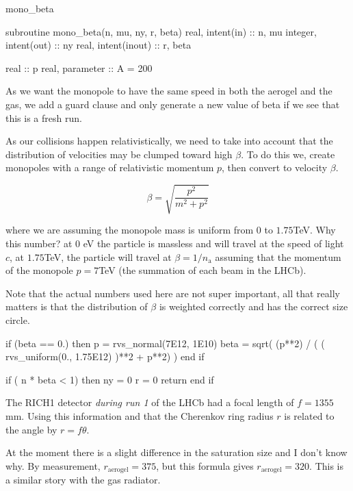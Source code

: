 \documentclass[10pt, a4paper]{article}
\begin{document}
\begin{codeblock}{mono_beta}
\begin{code}
subroutine mono_beta(n, mu, ny, r, beta)
	real, intent(in) :: n, mu
	integer, intent(out) :: ny
	real, intent(inout) :: r, beta
	
	real :: p
	real, parameter :: A = 200
\end{code}

As we want the monopole to have the same speed in both the aerogel and the gas, we add a guard clause and only generate a new value of beta if we see that this is a fresh run.

As our collisions happen relativistically, we need to take into account that the distribution of velocities may be clumped toward high $\beta$. To do this we, create monopoles with a range of relativistic momentum $p$, then convert to velocity $\beta$. 

\begin{equation}
 \beta = \sqrt{\frac{p^2}{m^2 + p^2}}
\end{equation}

where we are assuming the monopole mass is uniform from $0$ to $1.75$\si{\tera \electronvolt}. Why this number? at $0$ \si{\electronvolt} the particle is massless and will travel at the speed of light $c$, at  $1.75$\si{\tera \electronvolt}, the particle will travel at $\beta = 1/n_\text{a}$ assuming that the momentum of the monopole $p = 7$\si{\tera \electronvolt} (the summation of each beam in the LHCb).

Note that the actual numbers used here are not super important, all that really matters is that the distribution of $\beta$ is weighted correctly and has the correct size circle.

\begin{code}
	if (beta == 0.) then 
		p = rvs_normal(7E12, 1E10)
		beta = sqrt( (p**2) / ( ( rvs_uniform(0., 1.75E12) )**2 + p**2) )
	end if 

	if ( n * beta < 1) then 
		ny = 0
		r = 0
		return 
	end if 
\end{code}

The RICH1 detector \emph{during run 1} of the LHCb had a focal length of $f = 1355$\si{\milli \metre}. Using this information and that the Cherenkov ring radius $r$ is related to the angle by $r = f \theta$.

At the moment there is a slight difference in the saturation size and I don't know why. 
By measurement, $r_\text{aerogel} = 375$, but this formula gives $r_\text{aerogel} = 320$. This is a similar story with the gas radiator. 


\end{codeblock}
\end{document}
